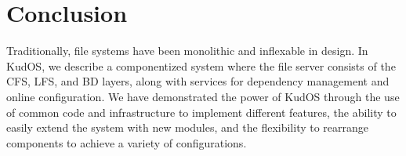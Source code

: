 \section{Conclusion}
\label{sec:conclusion}

Traditionally, file systems have been monolithic and inflexable in design. In
KudOS, we describe a componentized system where the file server consists of the
CFS, LFS, and BD layers, along with services for dependency management and
online configuration. We have demonstrated the power of KudOS through the
use of common code and infrastructure to implement different features, the
ability to easily extend the system with new modules, and the flexibility to
rearrange components to achieve a variety of configurations.
